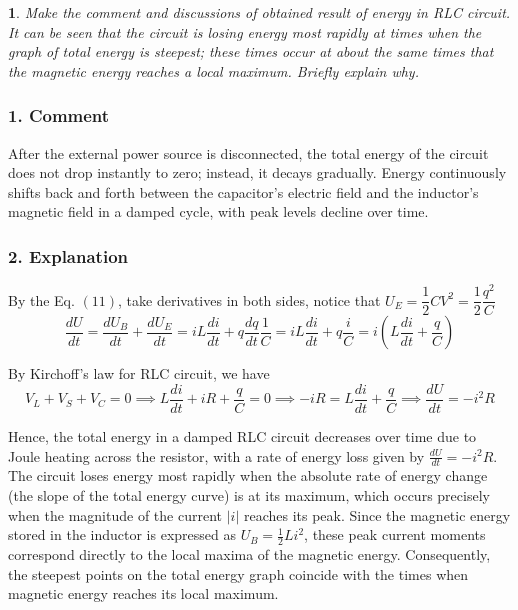 \documentclass[12pt,oneside,a4paper]{article}
\theoremstyle{definition}
\newtheorem{bt}{}
\begin{document}
	\begin{bt}
		\textit{Make the comment and discussions of obtained result of energy in RLC circuit. It can be seen that the circuit is losing energy most rapidly at times when the graph of total energy is steepest; these times occur at about the same times that the magnetic energy reaches a local maximum. Briefly explain why.}
		\subsubsection*{1. Comment}
		\hspace{1.23em}
		After the external power source is disconnected, the total energy of the circuit does not drop instantly to zero; instead, it decays gradually. Energy continuously shifts back and forth between the capacitor's electric field and the inductor's magnetic field in a damped cycle, with peak levels decline over time.
		
		\vspace{0.2cm}
		
		\subsubsection*{2. Explanation}
		\hspace{1.23em}
		By the Eq. $(11)$, take derivatives in both sides, notice that $U_E = \dfrac{1}{2} CV^2 = \dfrac{1}{2} \dfrac{q^2}{C}$
		\begin{equation}
			\dfrac{dU}{dt} = \dfrac{dU_B}{dt} + \dfrac{dU_E}{dt} = iL \dfrac{di}{dt} + q\dfrac{dq}{dt} \dfrac{1}{C} = iL \dfrac{di}{dt} + q \dfrac{i}{C} = i\left(L\dfrac{di}{dt} + \dfrac{q}{C}\right)
		\end{equation}
		
		By Kirchoff's law for RLC circuit, we have
		\begin{equation}
			V_L + V_S + V_C = 0 \implies L\dfrac{di}{dt} + iR + \dfrac{q}{C} = 0 \implies -iR = L\dfrac{di}{dt} + \dfrac{q}{C} \implies \dfrac{dU}{dt} = -i^2R
		\end{equation}
		
		Hence, the total energy in a damped RLC circuit decreases over time due to Joule heating across the resistor, with a rate of energy loss given by $\frac{dU}{dt} = -i^2 R$. The circuit loses energy most rapidly when the absolute rate of energy change (the slope of the total energy curve) is at its maximum, which occurs precisely when the magnitude of the current $\vert{}i\vert{}$ reaches its peak. Since the magnetic energy stored in the inductor is expressed as $U_B = \frac{1}{2} L i^2$, these peak current moments correspond directly to the local maxima of the magnetic energy. Consequently, the steepest points on the total energy graph coincide with the times when magnetic energy reaches its local maximum.
	\end{bt}
	
\end{document}
